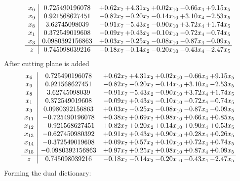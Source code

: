 \documentclass[8pt]{article}
\begin{document}
\[\begin{array}{c| c c@{\hskip 2pt} c@{\hskip 2pt} c@{\hskip 2pt} c@{\hskip 2pt} c@{\hskip 2pt} }
 x_{6}   &  0.725490196078 & +  0.62 x_{7} & +  4.31 x_{2} & +  0.02 x_{10} & -0.66 x_{4} & +  9.15 x_{5}\\
 x_{9}   &  0.921568627451 & -0.82 x_{7} & -0.20 x_{2} & -0.14 x_{10} & +  3.10 x_{4} & -2.53 x_{5}\\
 x_{8}   &  3.62745098039 & -0.91 x_{7} & -5.43 x_{2} & -0.90 x_{10} & +  3.72 x_{4} & +  1.74 x_{5}\\
 x_{1}   &  0.372549019608 & -0.09 x_{7} & +  0.43 x_{2} & -0.10 x_{10} & -0.72 x_{4} & -0.74 x_{5}\\
 x_{3}   &  0.0980392156863 & +  0.03 x_{7} & -0.25 x_{2} & -0.08 x_{10} & -0.87 x_{4} & -0.09 x_{5}\\
\hline
z    &  0.745098039216 & -0.18 x_{7} & -0.14 x_{2} & -0.20 x_{10} & -0.43 x_{4} & -2.47 x_{5}\\
\end{array}\]
 After cutting plane is added 
\[\begin{array}{c| c c@{\hskip 2pt} c@{\hskip 2pt} c@{\hskip 2pt} c@{\hskip 2pt} c@{\hskip 2pt} }
 x_{6}   &  0.725490196078 & +  0.62 x_{7} & +  4.31 x_{2} & +  0.02 x_{10} & -0.66 x_{4} & +  9.15 x_{5}\\
 x_{9}   &  0.921568627451 & -0.82 x_{7} & -0.20 x_{2} & -0.14 x_{10} & +  3.10 x_{4} & -2.53 x_{5}\\
 x_{8}   &  3.62745098039 & -0.91 x_{7} & -5.43 x_{2} & -0.90 x_{10} & +  3.72 x_{4} & +  1.74 x_{5}\\
 x_{1}   &  0.372549019608 & -0.09 x_{7} & +  0.43 x_{2} & -0.10 x_{10} & -0.72 x_{4} & -0.74 x_{5}\\
 x_{3}   &  0.0980392156863 & +  0.03 x_{7} & -0.25 x_{2} & -0.08 x_{10} & -0.87 x_{4} & -0.09 x_{5}\\
 x_{11}   &  -0.725490196078 & +  0.38 x_{7} & +  0.69 x_{2} & +  0.98 x_{10} & +  0.66 x_{4} & +  0.85 x_{5}\\
 x_{12}   &  -0.921568627451 & +  0.82 x_{7} & +  0.20 x_{2} & +  0.14 x_{10} & +  0.90 x_{4} & +  0.53 x_{5}\\
 x_{13}   &  -0.627450980392 & +  0.91 x_{7} & +  0.43 x_{2} & +  0.90 x_{10} & +  0.28 x_{4} & +  0.26 x_{5}\\
 x_{14}   &  -0.372549019608 & +  0.09 x_{7} & +  0.57 x_{2} & +  0.10 x_{10} & +  0.72 x_{4} & +  0.74 x_{5}\\
 x_{15}   &  -0.0980392156863 & +  0.97 x_{7} & +  0.25 x_{2} & +  0.08 x_{10} & +  0.87 x_{4} & +  0.09 x_{5}\\
\hline
z    &  0.745098039216 & -0.18 x_{7} & -0.14 x_{2} & -0.20 x_{10} & -0.43 x_{4} & -2.47 x_{5}\\
\end{array}\]
Forming the dual dictionary:
\end{document}

